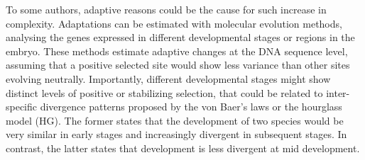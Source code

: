 \hfill\break 
To some authors, adaptive reasons could be the cause for such increase in complexity.
%
%
%
Adaptations can be estimated with molecular evolution methods, analysing the genes expressed in different developmental stages or regions in the embryo. 
These methods estimate adaptive changes at the DNA sequence level, assuming that
a positive selected site would show less variance than other sites evolving neutrally.
%
%
Importantly, different developmental stages might show distinct levels of positive or stabilizing selection, 
that could be related to inter-specific divergence patterns proposed by the von Baer's laws or the hourglass model (HG). 
The former states that the development of two species would be very similar in early stages and increasingly divergent in subsequent stages. In contrast, the latter states that development is less divergent at mid development.

